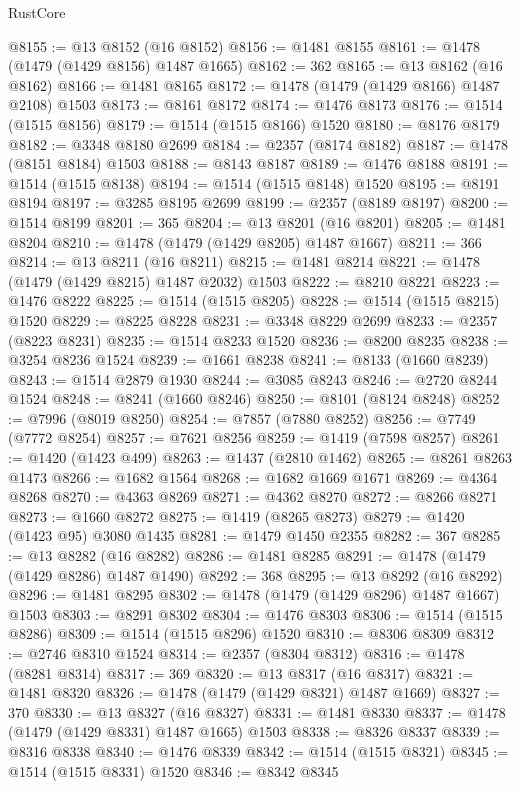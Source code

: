\begin{lexlean}{RustCore}
\begin{coremodule}
@8155 := @13 @8152 (@16 @8152)
@8156 := @1481 @8155
@8161 := @1478 (@1479 (@1429 @8156) @1487 @1665)
@8162 := 362
@8165 := @13 @8162 (@16 @8162)
@8166 := @1481 @8165
@8172 := @1478 (@1479 (@1429 @8166) @1487 @2108) @1503
@8173 := @8161 @8172
@8174 := @1476 @8173
@8176 := @1514 (@1515 @8156)
@8179 := @1514 (@1515 @8166) @1520
@8180 := @8176 @8179
@8182 := @3348 @8180 @2699
@8184 := @2357 (@8174 @8182)
@8187 := @1478 (@8151 @8184) @1503
@8188 := @8143 @8187
@8189 := @1476 @8188
@8191 := @1514 (@1515 @8138)
@8194 := @1514 (@1515 @8148) @1520
@8195 := @8191 @8194
@8197 := @3285 @8195 @2699
@8199 := @2357 (@8189 @8197)
@8200 := @1514 @8199
@8201 := 365
@8204 := @13 @8201 (@16 @8201)
@8205 := @1481 @8204
@8210 := @1478 (@1479 (@1429 @8205) @1487 @1667)
@8211 := 366
@8214 := @13 @8211 (@16 @8211)
@8215 := @1481 @8214
@8221 := @1478 (@1479 (@1429 @8215) @1487 @2032) @1503
@8222 := @8210 @8221
@8223 := @1476 @8222
@8225 := @1514 (@1515 @8205)
@8228 := @1514 (@1515 @8215) @1520
@8229 := @8225 @8228
@8231 := @3348 @8229 @2699
@8233 := @2357 (@8223 @8231)
@8235 := @1514 @8233 @1520
@8236 := @8200 @8235
@8238 := @3254 @8236 @1524
@8239 := @1661 @8238
@8241 := @8133 (@1660 @8239)
@8243 := @1514 @2879 @1930
@8244 := @3085 @8243
@8246 := @2720 @8244 @1524
@8248 := @8241 (@1660 @8246)
@8250 := @8101 (@8124 @8248)
@8252 := @7996 (@8019 @8250)
@8254 := @7857 (@7880 @8252)
@8256 := @7749 (@7772 @8254)
@8257 := @7621 @8256
@8259 := @1419 (@7598 @8257)
@8261 := @1420 (@1423 @499)
@8263 := @1437 (@2810 @1462)
@8265 := @8261 @8263 @1473
@8266 := @1682 @1564
@8268 := @1682 @1669 @1671
@8269 := @4364 @8268
@8270 := @4363 @8269
@8271 := @4362 @8270
@8272 := @8266 @8271
@8273 := @1660 @8272
@8275 := @1419 (@8265 @8273)
@8279 := @1420 (@1423 @95) @3080 @1435
@8281 := @1479 @1450 @2355
@8282 := 367
@8285 := @13 @8282 (@16 @8282)
@8286 := @1481 @8285
@8291 := @1478 (@1479 (@1429 @8286) @1487 @1490)
@8292 := 368
@8295 := @13 @8292 (@16 @8292)
@8296 := @1481 @8295
@8302 := @1478 (@1479 (@1429 @8296) @1487 @1667) @1503
@8303 := @8291 @8302
@8304 := @1476 @8303
@8306 := @1514 (@1515 @8286)
@8309 := @1514 (@1515 @8296) @1520
@8310 := @8306 @8309
@8312 := @2746 @8310 @1524
@8314 := @2357 (@8304 @8312)
@8316 := @1478 (@8281 @8314)
@8317 := 369
@8320 := @13 @8317 (@16 @8317)
@8321 := @1481 @8320
@8326 := @1478 (@1479 (@1429 @8321) @1487 @1669)
@8327 := 370
@8330 := @13 @8327 (@16 @8327)
@8331 := @1481 @8330
@8337 := @1478 (@1479 (@1429 @8331) @1487 @1665) @1503
@8338 := @8326 @8337
@8339 := @8316 @8338
@8340 := @1476 @8339
@8342 := @1514 (@1515 @8321)
@8345 := @1514 (@1515 @8331) @1520
@8346 := @8342 @8345

\end{coremodule}
\end{lexlean}
